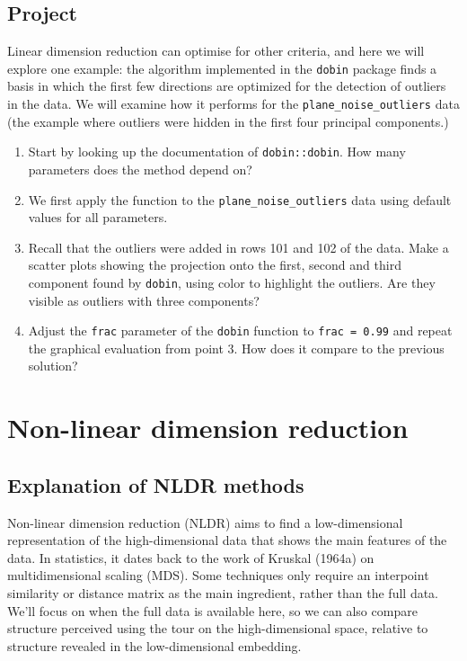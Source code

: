 \documentclass[
  letterpaper,
]{krantz}
\providecommand{\tightlist}{%
  \setlength{\itemsep}{0pt}\setlength{\parskip}{0pt}}\usepackage{longtable,booktabs,array}
\begin{document}
\section*{Project}\label{project}


Linear dimension reduction can optimise for other criteria, and here we
will explore one example: the algorithm implemented in the
\texttt{dobin} package finds a basis in which the first few directions
are optimized for the detection of outliers in the data. We will examine
how it performs for the \texttt{plane\_noise\_outliers} data (the
example where outliers were hidden in the first four principal
components.)

\begin{enumerate}
\def\labelenumi{\arabic{enumi}.}
\tightlist
\item
  Start by looking up the documentation of \texttt{dobin::dobin}. How
  many parameters does the method depend on?
\item
  We first apply the function to the \texttt{plane\_noise\_outliers}
  data using default values for all parameters.
\item
  Recall that the outliers were added in rows 101 and 102 of the data.
  Make a scatter plots showing the projection onto the first, second and
  third component found by \texttt{dobin}, using color to highlight the
  outliers. Are they visible as outliers with three components?
\item
  Adjust the \texttt{frac} parameter of the \texttt{dobin} function to
  \texttt{frac\ =\ 0.99} and repeat the graphical evaluation from point
  3. How does it compare to the previous solution?
\end{enumerate}


\chapter{Non-linear dimension
reduction}\label{non-linear-dimension-reduction}

\section{Explanation of NLDR methods}\label{explanation-of-nldr-methods}

Non-linear dimension reduction (NLDR) aims to find a low-dimensional
representation of the high-dimensional data that shows the main features
of the data. In statistics, it dates back to the work of Kruskal (1964a)
on multidimensional scaling (MDS). Some techniques only require an
interpoint similarity or distance matrix as the main ingredient, rather
than the full data. We'll focus on when the full data is available here,
so we can also compare structure perceived using the tour on the
high-dimensional space, relative to structure revealed in the
low-dimensional embedding.
\end{document}
